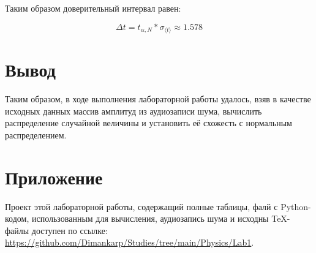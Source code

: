 \documentclass[12pt, a4paper]{article}
\begin{document}
Таким образом доверительный интервал равен:

\begin{equation*}
\Delta t = t_{\alpha, N} * \sigma_{\langle t \rangle} \approx 1.578 
\end{equation*}


\section{Вывод}
Таким образом, в ходе выполнения лабораторной работы удалось, взяв в качестве исходных данных массив амплитуд из аудиозаписи шума, вычислить распределение случайной величины и установить её схожесть с нормальным распределением.


\section{Приложение}
Проект этой лабораторной работы, содержащий полные таблицы, фалй с Python-кодом, использованным для вычисления, аудиозапись шума и исходны TeX-файлы доступен по ссылке: \url{https://github.com/Dimankarp/Studies/tree/main/Physics/Lab1}.
\end{document}
